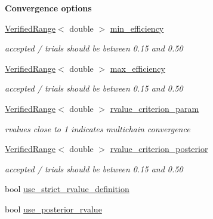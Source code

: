 \begin{Indent}{\bf Convergence options}\par
{\em \label{_amgrp2ecab0cd070c5334d222a1622ad7552f}
 }\begin{DoxyCompactItemize}
\item 
\hyperlink{classeos_1_1VerifiedRange}{VerifiedRange}$<$ double $>$ \hyperlink{classeos_1_1MarkovChainSampler_1_1Config_a0d907985d270035dbc3fc2235667ed0e}{min\_\-efficiency}
\begin{DoxyCompactList}\small\item\em accepted / trials should be between 0.15 and 0.50 \item\end{DoxyCompactList}\item 
\hyperlink{classeos_1_1VerifiedRange}{VerifiedRange}$<$ double $>$ \hyperlink{classeos_1_1MarkovChainSampler_1_1Config_a91c8438fe3b3270c619aefe5dc951e35}{max\_\-efficiency}
\begin{DoxyCompactList}\small\item\em accepted / trials should be between 0.15 and 0.50 \item\end{DoxyCompactList}\item 
\hyperlink{classeos_1_1VerifiedRange}{VerifiedRange}$<$ double $>$ \hyperlink{classeos_1_1MarkovChainSampler_1_1Config_ae8f8b1d037b655fe421c642cfe1d09a3}{rvalue\_\-criterion\_\-param}
\begin{DoxyCompactList}\small\item\em rvalues close to 1 indicates multichain convergence \item\end{DoxyCompactList}\item 
\hyperlink{classeos_1_1VerifiedRange}{VerifiedRange}$<$ double $>$ \hyperlink{classeos_1_1MarkovChainSampler_1_1Config_ac63f8561002681b27414ef775f6f7c2c}{rvalue\_\-criterion\_\-posterior}
\begin{DoxyCompactList}\small\item\em accepted / trials should be between 0.15 and 0.50 \item\end{DoxyCompactList}\item 
bool \hyperlink{classeos_1_1MarkovChainSampler_1_1Config_a489bcbea5b78163dbfde22225b980d8c}{use\_\-strict\_\-rvalue\_\-definition}
\item 
bool \hyperlink{classeos_1_1MarkovChainSampler_1_1Config_a1243022c46d489f741762e90aeb1ca31}{use\_\-posterior\_\-rvalue}
\item 

\end{DoxyCompactItemize}
\end{Indent}
